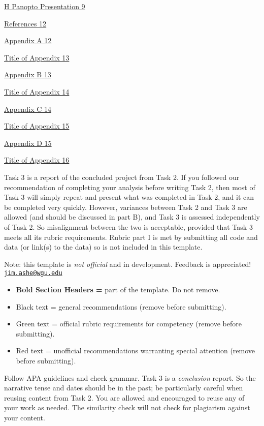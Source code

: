 \protect\hyperlink{h-panopto-presentation}{H Panopto Presentation 9}

\protect\hyperlink{references}{References 12}

\protect\hyperlink{appendix-a}{Appendix A 12}

\protect\hyperlink{title-of-appendix}{Title of Appendix 13}

\protect\hyperlink{appendix-b}{Appendix B 13}

\protect\hyperlink{title-of-appendix-1}{Title of Appendix 14}

\protect\hyperlink{appendix-c}{Appendix C 14}

\protect\hyperlink{title-of-appendix-2}{Title of Appendix 15}

\protect\hyperlink{appendix-d}{Appendix D 15}

\protect\hyperlink{title-of-appendix-3}{Title of Appendix 16}

Task 3 is a report of the concluded project from Task 2. If you followed
our recommendation of completing your analysis before writing Task 2,
then most of Task 3 will simply repeat and present what was completed in
Task 2, and it can be completed very quickly. However, variances between
Task 2 and Task 3 are allowed (and should be discussed in part B), and
Task 3 is assessed independently of Task 2. So misalignment between the
two is acceptable, provided that Task 3 meets all its rubric
requirements. Rubric part I is met by submitting all code and data (or
link(s) to the data) so is not included in this template.

Note: this template is \emph{not official} and in development. Feedback
is appreciated!
\href{mailto:jim.ashe@wgu.edu}{\nolinkurl{jim.ashe@wgu.edu}}

\begin{itemize}
\item
  \textbf{Bold Section Headers =} part of the template. Do not remove.
\item
  Black text = general recommendations (remove before submitting).
\item
  Green text = official rubric requirements for competency (remove
  before submitting).
\item
  Red text = unofficial recommendations warranting special attention
  (remove before submitting).
\end{itemize}

Follow APA guidelines and check grammar. Task 3 is a \emph{conclusion}
report. So the narrative tense and dates should be in the past; be
particularly careful when reusing content from Task 2. You are allowed
and encouraged to reuse any of your work as needed. The similarity check
will not check for plagiarism against your content.

